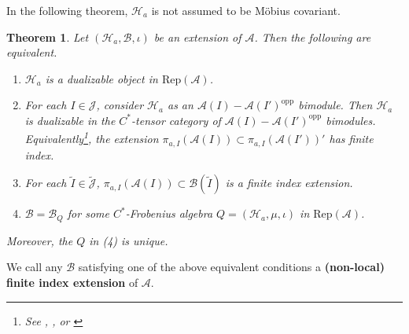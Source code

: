 \documentclass[12pt,a4paper,notitlepage]{article}
\theoremstyle{definition}
\theoremstyle{plain}
\newtheorem{thm}[df]{Theorem}
\newcommand{\mc}{\mathcal}
\newcommand{\wtd}{\widetilde}
\newcommand{\opp}{\mathrm{opp}}
\newcommand{\Jtd}{\widetilde{\mathcal J}}
\newcommand{\RepA}{\mathrm{Rep}(\mathcal A)}
\numberwithin{equation}{section}
\begin{document}
In the following theorem, $\mc H_a$ is not assumed to be M\"obius covariant. 


\begin{thm}\label{lb11}
Let $(\mc H_a,\mc B,\iota)$ be an extension of $\mc A$. Then the following are equivalent.
\begin{enumerate}[label=(\arabic*)]
\item $\mc H_a$ is a dualizable object in $\RepA$.
\item For each $I\in\mc J$, consider $\mc H_a$ as an $\mc A(I)-\mc A(I')^\opp$ bimodule. Then  $\mc H_a$ is dualizable in the $C^*$-tensor category of $\mc A(I)-\mc A(I')^\opp$ bimodules. Equivalently\footnote{See \cite{Lon90}, \cite[Sec. 2.7]{LR95}, or \cite[Sec. 7]{BDH14}}, the extension $\pi_{a,I}(\mc A(I))\subset \pi_{a,I}(\mc A(I'))'$ has finite index.
\item For each $\wtd I \in\Jtd$, $\pi_{a,I}(\mc A(I))\subset\mc B(\wtd I)$ is a finite index extension.
\item $\mc B=\mc B_Q$ for some $C^*$-Frobenius algebra $Q=(\mc H_a,\mu,\iota)$ in $\RepA$.
\end{enumerate} 	
Moreover, the $Q$ in (4) is unique.
\end{thm}	

We call any $\mc B$ satisfying one of the above equivalent conditions a \textbf{(non-local) finite index extension} of $\mc A$.
\end{document}
